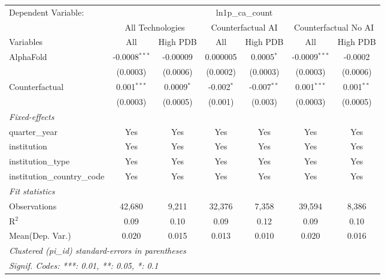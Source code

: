 \begingroup
\centering
\begin{tabular}{lcccccc}
   \tabularnewline \midrule \midrule
   Dependent Variable: & \multicolumn{6}{c}{ln1p\_ca\_count}\\
 & \multicolumn{2}{c}{All Technologies} & \multicolumn{2}{c}{Counterfactual AI} & \multicolumn{2}{c}{Counterfactual No AI} \\
\cmidrule(lr){1-1}\cmidrule(lr){2-3} \cmidrule(lr){4-5} \cmidrule(lr){6-7}
Variables & \multicolumn{1}{c}{All} & \multicolumn{1}{c}{High PDB} & \multicolumn{1}{c}{All} & \multicolumn{1}{c}{High PDB} & \multicolumn{1}{c}{All} & \multicolumn{1}{c}{High PDB} \\
\cmidrule(lr){1-1}\cmidrule(lr){2-2} \cmidrule(lr){3-3} \cmidrule(lr){4-4} \cmidrule(lr){5-5} \cmidrule(lr){6-6} \cmidrule(lr){7-7}
   AlphaFold                    & -0.0008$^{***}$ & -0.00009     & 0.000005     & 0.0005$^{*}$  & -0.0009$^{***}$ & -0.0002\\   
                                & (0.0003)        & (0.0006)     & (0.0002)     & (0.0003)      & (0.0003)        & (0.0006)\\   
   Counterfactual               & 0.001$^{***}$   & 0.0009$^{*}$ & -0.002$^{*}$ & -0.007$^{**}$ & 0.001$^{***}$   & 0.001$^{**}$\\   
                                & (0.0003)        & (0.0005)     & (0.001)      & (0.003)       & (0.0003)        & (0.0005)\\   
   \midrule
   \emph{Fixed-effects}\\
   quarter\_year                & Yes             & Yes          & Yes          & Yes           & Yes             & Yes\\  
   institution                  & Yes             & Yes          & Yes          & Yes           & Yes             & Yes\\  
   institution\_type            & Yes             & Yes          & Yes          & Yes           & Yes             & Yes\\  
   institution\_country\_code   & Yes             & Yes          & Yes          & Yes           & Yes             & Yes\\  
   \midrule
   \emph{Fit statistics}\\
   Observations                 & 42,680          & 9,211        & 32,376       & 7,358         & 39,594          & 8,386\\  
   R$^2$                        & 0.09            & 0.10         & 0.09         & 0.12          & 0.09            & 0.10\\  
Mean(Dep. Var.) & 0.020 & 0.015 & 0.013 & 0.010 & 0.020 & 0.016 \\
   \midrule \midrule
   \multicolumn{7}{l}{\emph{Clustered (pi\_id) standard-errors in parentheses}}\\
   \multicolumn{7}{l}{\emph{Signif. Codes: ***: 0.01, **: 0.05, *: 0.1}}\\
\end{tabular}
\par\endgroup
